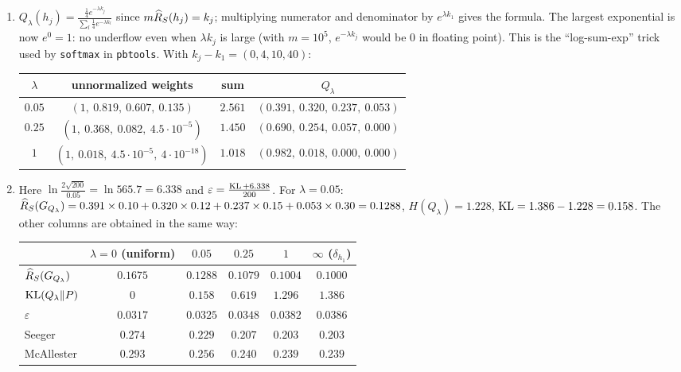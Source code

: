 \documentclass[11pt]{article}
\begin{document}
\begin{solution}
\begin{enumerate}
\item $Q_\lambda(h_j)=\frac{\frac14e^{-\lambda k_j}}{\sum_l\frac14e^{-\lambda k_l}}$ since $m\widehat{R}_{S}(h_j)=k_j$; multiplying numerator and denominator by
      $e^{\lambda k_1}$ gives the formula. The largest exponential is now $e^0=1$: no underflow even when $\lambda k_j$ is
      large (with $m=10^5$, $e^{-\lambda k_j}$ would be $0$ in floating point). This is the ``log-sum-exp'' trick used by
      \texttt{softmax} in \texttt{pbtools}. With $k_j-k_1=(0,4,10,40)$:
      \begin{center}
      \begin{tabular}{cccc}\toprule
      $\lambda$ & unnormalized weights & sum & $Q_\lambda$\\\midrule
      $0.05$ & $(1,\ 0.819,\ 0.607,\ 0.135)$ & $2.561$ & $(0.391,\ 0.320,\ 0.237,\ 0.053)$\\
      $0.25$ & $(1,\ 0.368,\ 0.082,\ 4.5\cdot10^{-5})$ & $1.450$ & $(0.690,\ 0.254,\ 0.057,\ 0.000)$\\
      $1$ & $(1,\ 0.018,\ 4.5\cdot10^{-5},\ 4\cdot10^{-18})$ & $1.018$ & $(0.982,\ 0.018,\ 0.000,\ 0.000)$\\\bottomrule
      \end{tabular}
      \end{center}
\item Here $\ln\frac{2\sqrt{200}}{0.05}=\ln565.7=6.338$ and $\varepsilon=\frac{\operatorname{KL}+6.338}{200}$. For $\lambda=0.05$:
      $\widehat{R}_{S}(G_{Q_\lambda})=0.391\times0.10+0.320\times0.12+0.237\times0.15+0.053\times0.30=0.1288$, $H(Q_\lambda)=1.228$, $\operatorname{KL}=1.386-1.228=0.158$.
      The other columns are obtained in the same way:
      \begin{center}
      \renewcommand{\arraystretch}{1.1}
      \begin{tabular}{lccccc}\toprule
      & $\lambda=0$ (uniform) & $0.05$ & $0.25$ & $1$ & $\infty$ ($\delta_{h_1}$)\\\midrule
      $\widehat{R}_{S}(G_{Q_\lambda})$ & $0.1675$ & $0.1288$ & $0.1079$ & $0.1004$ & $0.1000$\\
      $\operatorname{KL}(Q_\lambda\|P)$ & $0$ & $0.158$ & $0.619$ & $1.296$ & $1.386$\\
      $\varepsilon$ & $0.0317$ & $0.0325$ & $0.0348$ & $0.0382$ & $0.0386$\\
      Seeger & $0.274$ & $0.229$ & $0.207$ & $0.203$ & $0.203$\\
      McAllester & $0.293$ & $0.256$ & $0.240$ & $0.239$ & $0.239$\\\bottomrule

\end{tabular}
\end{center}
\end{enumerate}
\end{solution}
\end{document}
